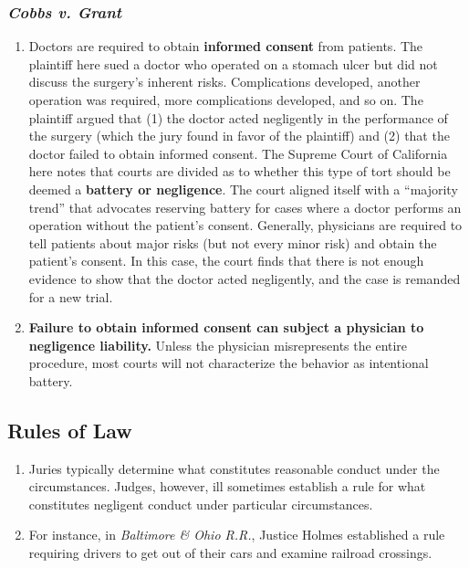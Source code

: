 \subsubsection{\emph{Cobbs v. Grant}}

\begin{enumerate}
    \item Doctors are required to obtain \textbf{informed consent} from patients. The plaintiff here sued a doctor who operated on a stomach ulcer but did not discuss the surgery's inherent risks. Complications developed, another operation was required, more complications developed, and so on. The plaintiff argued that (1) the doctor acted negligently in the performance of the surgery (which the jury found in favor of the plaintiff) and (2) that the doctor failed to obtain informed consent. The Supreme Court of California here notes that courts are divided as to whether this type of tort should be deemed a \textbf{battery or negligence}. The court aligned itself with a ``majority trend'' that advocates reserving battery for cases where a doctor performs an operation without the patient's consent. Generally, physicians are required to tell patients about major risks (but not every minor risk) and obtain the patient's consent. In this case, the court finds that there is not enough evidence to show that the doctor acted negligently, and the case is remanded for a new trial.
    \item \textbf{Failure to obtain informed consent can subject a physician to negligence liability.} Unless the physician misrepresents the entire procedure, most courts will not characterize the behavior as intentional battery.
\end{enumerate}

\subsection{Rules of Law}

\begin{enumerate}
    \item Juries typically determine what constitutes reasonable conduct under the circumstances. Judges, however, ill sometimes establish a rule for what constitutes negligent conduct under particular circumstances.
    \item For instance, in \emph{Baltimore \& Ohio R.R.}, Justice Holmes established a rule requiring drivers to get out of their cars and examine railroad crossings.
\end{enumerate}

